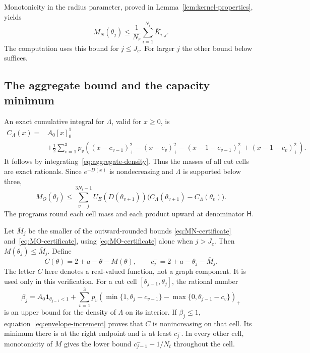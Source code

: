 \documentclass[11pt]{article}
\numberwithin{equation}{section}
\theoremstyle{definition}
\newcommand{\ind}{\mathbf 1}
\newcommand{\pos}[1]{\left(#1\right)_{+}}
\begin{document}
Monotonicity in the radius parameter, proved in
Lemma~\ref{lem:kernel-properties}, yields
\begin{equation}\label{eq:MN-certificate}
 M_N(\theta_j)\le\frac1{N_r}\sum_{i=1}^{N_r}\overline K_{i,j}.
\end{equation}
The computation uses this bound for $j\le J_c$. For larger $j$ the
other bound below suffices.

\subsection{The aggregate bound and the capacity minimum}

An exact cumulative integral for $\Lambda$, valid for $x\ge0$, is
\begin{equation}\label{eq:aggregate-cdf}
\begin{split}
 C_\Lambda(x)={}&A_0[x]_0^1\\
 &+\frac12\sum_{v=1}^3p_v\left(
 (x-c_{v-1})_+^2-(x-c_v)_+^2
 -(x-1-c_{v-1})_+^2+(x-1-c_v)_+^2\right).
\end{split}
\end{equation}
It follows by integrating~\eqref{eq:aggregate-density}.
Thus the masses of all cut cells are exact rationals.
Since $e^{-D(x)}$ is nondecreasing and $\Lambda$ is supported below
three,
\begin{equation}\label{eq:MO-certificate}
 M_O(\theta_j)\le
 \sum_{v=j}^{3N_t-1}
 U_E(D(\theta_{v+1}))
       \bigl(C_\Lambda(\theta_{v+1})-C_\Lambda(\theta_v)\bigr).
\end{equation}
The programs round each cell mass and each product upward at
denominator $\mathsf H$.

Let $\overline M_j$ be the smaller of the outward-rounded bounds
\eqref{eq:MN-certificate} and~\eqref{eq:MO-certificate}, using
\eqref{eq:MO-certificate} alone when $j>J_c$.
Then $M(\theta_j)\le\overline M_j$.
Define
\[
 C(\theta)=2+a-\theta-M(\theta),\qquad
 c_j^-=2+a-\theta_j-\overline M_j.
\]
The letter $C$ here denotes a real-valued function, not a graph
component. It is used only in this verification.
For a cut cell $[\theta_{j-1},\theta_j]$, the rational number
\begin{equation}\label{eq:density-cell-upper}
 \beta_j=A_0\ind_{\theta_{j-1}<1}
  +\sum_{v=1}^3p_v
    \pos{\min\{1,\theta_j-c_{v-1}\}
                   -\max\{0,\theta_{j-1}-c_v\}}
\end{equation}
is an upper bound for the density of $\Lambda$ on its interior.
If $\beta_j\le1$, equation~\eqref{eq:envelope-increment} proves
that $C$ is nonincreasing on that cell. Its minimum there is at the
right endpoint and is at least $c_j^-$.
In every other cell, monotonicity of $M$ gives the lower bound
$c_{j-1}^- - 1/N_t$ throughout the cell.
\end{document}
